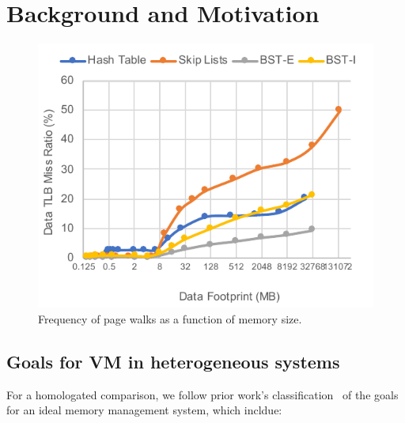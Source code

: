 \section{Background and Motivation}
\label{sec:background}

\begin{figure}[t]
   \centering
   \includegraphics[width=1.0\columnwidth]{graphs/pagewalks.pdf}
   \caption{Frequency of page walks as a function of memory size.}
   \label{fig:pagewalks}
\end{figure}

\subsection{Goals for VM in heterogeneous systems}
For a homologated comparison, we follow prior work's classification~\cite{haria:devirtualizing} of the goals for an ideal memory management system, which incldue:

